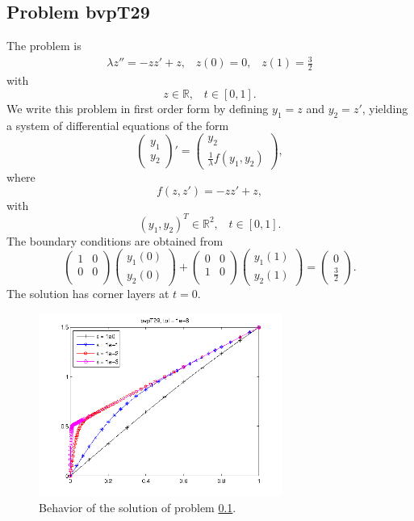 \documentclass[<options>]{article}
\def \RR {{\mathbb{R}}}
\begin{document}
\subsection{Problem bvpT29}\label{test29}
The problem is 
\begin{eqnarray*}
\lambda z'' = - z z' +  z , \;\;\;z(0) =0, \;\;\; z(1) = \frac{3}{2}
\end{eqnarray*}
with
\[
z \in \RR, \;\;\; t\in [0,1].
\]
We write this problem in first order form by defining $y_1=z$ and $y_2=z'$, yielding a system of differential equations of the form
\begin{equation*}
\left(\begin{array}{c}
y_1\\
y_2
\end{array}\right)'=
\left(\begin{array}{c}
y_2\\
\frac{1}{\lambda}f(y_1,y_2)
\end{array}\right),
\end{equation*}
where
\begin{equation*}
 f(z,z') = - z z' +  z,
\end{equation*}
with
\[
(y_1,y_2)^T \in \RR^{2}, \;\;\;  t \in [0,1].
\]
The  boundary conditions are obtained from
\begin{equation*}
\left(
  \begin{array}{cc}
    1 & 0 \\
    0 & 0 \\
  \end{array}
\right)
\left(\begin{array}{c}
y_{1}(0)\\
y_{2}(0)
\end{array}\right)
+
\left(
  \begin{array}{cc}
    0 & 0 \\
    1 & 0 \\
  \end{array}
\right)
\left(\begin{array}{c}
y_{1}(1)\\
y_{2}(1)
\end{array}\right)=\left(\begin{array}{c}
0 \\
\frac{3}{2}
\end{array}\right).
\end{equation*}
The solution has corner layers at $t= 0.$

\begin{figure}[htb]
\centerline{\includegraphics[height=6cm]{Prob29}}
\caption{Behavior of the solution of problem \ref{test29}.}
\end{figure}
\newpage
\end{document}
